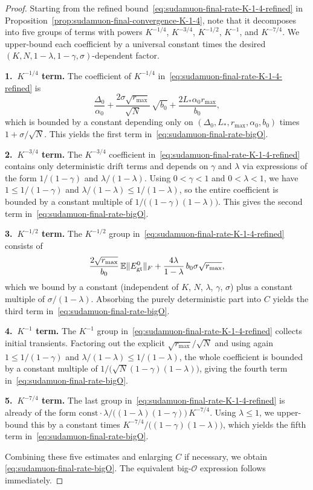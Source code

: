 \documentclass{article}
\begin{document}
\begin{proof}
Starting from the refined bound~\eqref{eq:sudamuon-final-rate-K-1-4-refined} in
Proposition~\ref{prop:sudamuon-final-convergence-K-1-4}, note that it decomposes into
five groups of terms with powers $K^{-1/4}$, $K^{-3/4}$, $K^{-1/2}$, $K^{-1}$, and $K^{-7/4}$.
We upper-bound each coefficient by a universal constant times the desired
$(K,N,1-\lambda,1-\gamma,\sigma)$-dependent factor.

\medskip\noindent\textbf{1.\ $K^{-1/4}$ term.}
The coefficient of $K^{-1/4}$ in~\eqref{eq:sudamuon-final-rate-K-1-4-refined} is
\[
\frac{\Delta_0}{\alpha_0}
+ \frac{2\sigma\sqrt{r_{\max}}}{\sqrt N}\,\sqrt{b_0}
+ \frac{2L_*\alpha_0 r_{\max}}{b_0},
\]
which is bounded by a constant depending only on
$(\Delta_0, L_*, r_{\max}, \alpha_0, b_0)$ times $1+\sigma/\sqrt{N}$.
This yields the first term in~\eqref{eq:sudamuon-final-rate-bigO}.

\medskip\noindent\textbf{2.\ $K^{-3/4}$ term.}
The $K^{-3/4}$ coefficient in~\eqref{eq:sudamuon-final-rate-K-1-4-refined}
contains only deterministic drift terms and depends on $\gamma$ and $\lambda$ via
expressions of the form $1/(1-\gamma)$ and $\lambda/(1-\lambda)$.
Using $0<\gamma<1$ and $0<\lambda<1$, we have $1\le 1/(1-\gamma)$ and
$\lambda/(1-\lambda)\le 1/(1-\lambda)$, so the entire coefficient is bounded by
a constant multiple of $1/\bigl((1-\gamma)(1-\lambda)\bigr)$.
This gives the second term in~\eqref{eq:sudamuon-final-rate-bigO}.

\medskip\noindent\textbf{3.\ $K^{-1/2}$ term.}
The $K^{-1/2}$ group in~\eqref{eq:sudamuon-final-rate-K-1-4-refined} consists of
\[
\frac{2\sqrt{r_{\max}}}{b_0}\,\mathbb{E}\|E_{\rm gt}^0\|_F
+ \frac{4\lambda}{1-\lambda}\,b_0\sigma\sqrt{r_{\max}},
\]
which we bound by a constant (independent of $K$, $N$, $\lambda$, $\gamma$, $\sigma$)
plus a constant multiple of $\sigma/(1-\lambda)$.
Absorbing the purely deterministic part into $C$ yields the third term
in~\eqref{eq:sudamuon-final-rate-bigO}.

\medskip\noindent\textbf{4.\ $K^{-1}$ term.}
The $K^{-1}$ group in~\eqref{eq:sudamuon-final-rate-K-1-4-refined} collects
initial transients. Factoring out the explicit $\sqrt{r_{\max}}/\sqrt N$ and
using again $1\le 1/(1-\gamma)$ and $\lambda/(1-\lambda)\le 1/(1-\lambda)$, the
whole coefficient is bounded by a constant multiple of
$1/\bigl(\sqrt{N}(1-\gamma)(1-\lambda)\bigr)$, giving the fourth term
in~\eqref{eq:sudamuon-final-rate-bigO}.

\medskip\noindent\textbf{5.\ $K^{-7/4}$ term.}
The last group in~\eqref{eq:sudamuon-final-rate-K-1-4-refined} is already of the form
$\text{const}\cdot \lambda/\bigl((1-\lambda)(1-\gamma)\bigr)\,K^{-7/4}$.
Using $\lambda\le 1$, we upper-bound this by a constant times
$K^{-7/4}/\bigl((1-\gamma)(1-\lambda)\bigr)$, which yields the fifth term
in~\eqref{eq:sudamuon-final-rate-bigO}.

Combining these five estimates and enlarging $C$ if necessary, we obtain
\eqref{eq:sudamuon-final-rate-bigO}. The equivalent big-$\mathcal{O}$ expression
follows immediately.
\end{proof}
\end{document}
